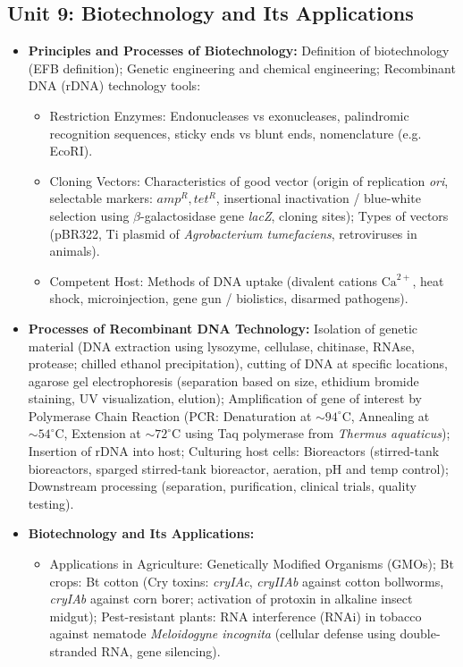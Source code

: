 \documentclass[11pt,a4paper]{article}
\begin{document}
\subsection{Unit 9: Biotechnology and Its Applications}
\begin{itemize}
  \item \textbf{Principles and Processes of Biotechnology:} Definition of biotechnology (EFB definition); Genetic engineering and chemical engineering; Recombinant DNA (rDNA) technology tools:
  \begin{itemize}
    \item Restriction Enzymes: Endonucleases vs exonucleases, palindromic recognition sequences, sticky ends vs blunt ends, nomenclature (e.g. EcoRI).
    \item Cloning Vectors: Characteristics of good vector (origin of replication \textit{ori}, selectable markers: $amp^R, tet^R$, insertional inactivation / blue-white selection using $\beta$-galactosidase gene \textit{lacZ}, cloning sites); Types of vectors (pBR322, Ti plasmid of \textit{Agrobacterium tumefaciens}, retroviruses in animals).
    \item Competent Host: Methods of DNA uptake (divalent cations $\text{Ca}^{2+}$, heat shock, microinjection, gene gun / biolistics, disarmed pathogens).
  \end{itemize}
  \item \textbf{Processes of Recombinant DNA Technology:} Isolation of genetic material (DNA extraction using lysozyme, cellulase, chitinase, RNAse, protease; chilled ethanol precipitation), cutting of DNA at specific locations, agarose gel electrophoresis (separation based on size, ethidium bromide staining, UV visualization, elution); Amplification of gene of interest by Polymerase Chain Reaction (PCR: Denaturation at $\sim 94^\circ\text{C}$, Annealing at $\sim 54^\circ\text{C}$, Extension at $\sim 72^\circ\text{C}$ using Taq polymerase from \textit{Thermus aquaticus}); Insertion of rDNA into host; Culturing host cells: Bioreactors (stirred-tank bioreactors, sparged stirred-tank bioreactor, aeration, pH and temp control); Downstream processing (separation, purification, clinical trials, quality testing).
  \item \textbf{Biotechnology and Its Applications:}
  \begin{itemize}
    \item Applications in Agriculture: Genetically Modified Organisms (GMOs); Bt crops: Bt cotton (Cry toxins: \textit{cryIAc}, \textit{cryIIAb} against cotton bollworms, \textit{cryIAb} against corn borer; activation of protoxin in alkaline insect midgut); Pest-resistant plants: RNA interference (RNAi) in tobacco against nematode \textit{Meloidogyne incognita} (cellular defense using double-stranded RNA, gene silencing).

\end{itemize}
\end{itemize}
\end{document}
